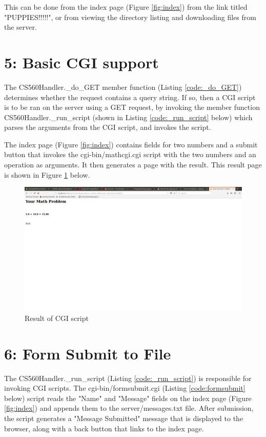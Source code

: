 \documentclass{article}
\begin{document}
	This can be done from the index page (Figure \ref{fig:index}) from the link titled "PUPPIES!!!!!", or from viewing the directory listing and downloading files from the server.
	
\section*{5: Basic CGI support}
	The CS560Handler.\_do\_GET member function (Listing \ref{code:_do_GET}) determines whether the request contains a query string. If so, then a CGI script is to be ran on the server using a GET request, by invoking the member function CS560Handler.\_run\_script (shown in Listing \ref{code:_run_script} below) which parses the arguments from the CGI script, and invokes the script.

	
	
	The index page (Figure \ref{fig:index}) contains fields for two numbers and a submit button that invokes the cgi-bin/mathcgi.cgi script with the two numbers and an operation as arguments. It then generates a page with the result. This result page is shown in Figure \ref{fig:mathresult} below.

	\begin{figure}[H]
		\includegraphics[width=\textwidth]{math.png}
		\centering
		\caption{Result of CGI script}
		\label{fig:mathresult}
	\end{figure}

\section*{6: Form Submit to File}
	The CS560Handler.\_run\_script (Listing \ref{code:_run_script}) is responsible for invoking CGI scripts. The cgi-bin/formsubmit.cgi (Listing \ref{code:formsubmit} below) script reads the "Name" and "Message" fields on the index page (Figure \ref{fig:index}) and appends them to the server/messages.txt file. After submission, the script generates a "Message Submitted" message that is displayed to the browser, along with a back button that links to the index page. 
\end{document}
